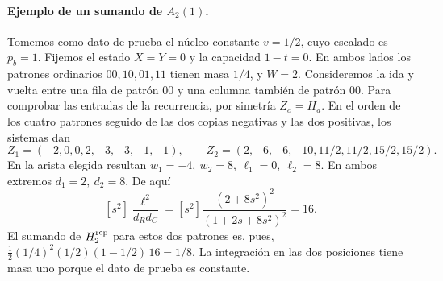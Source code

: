 \paragraph{Ejemplo de un sumando de \(A_2(1)\).}
Tomemos como dato de prueba el núcleo constante \(v=1/2\), cuyo escalado es \(p_b=1\).
Fijemos el estado \(X=Y=0\) y la capacidad \(1-t=0\). En ambos lados los patrones
ordinarios \(00,10,01,11\) tienen masa \(1/4\), y \(W=2\). Consideremos la ida y vuelta
entre una fila de patrón \(00\) y una columna también de patrón \(00\).
Para comprobar las entradas de la recurrencia, por simetría \(Z_a=H_a\). En el orden de
los cuatro patrones seguido de las dos copias negativas y las dos positivas, los sistemas dan
\[
 Z_1=(-2,0,0,2,-3,-3,-1,-1),\qquad
 Z_2=(2,-6,-6,-10,11/2,11/2,15/2,15/2).
\]
En la arista elegida resultan \(w_1=-4,\ w_2=8,\ \ell_1=0,\ \ell_2=8\).
En ambos extremos \(d_1=2,\ d_2=8\). De aquí
\[
 [s^2]\frac{\ell^2}{d_Rd_C}
 =[s^2]\frac{(2+8s^2)^2}{(1+2s+8s^2)^2}=16 .
\]
El sumando de \(H_2^{\rm rep}\) para estos dos patrones es, pues,
\(\tfrac12(1/4)^2(1/2)(1-1/2)\,16=1/8\).
La integración en las dos posiciones tiene masa uno porque el dato de prueba es constante.
